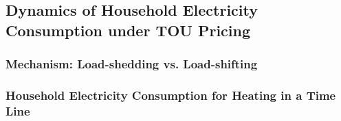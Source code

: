 \subsection{Dynamics of Household Electricity Consumption under TOU Pricing}
\label{Subsection:Dynamics-of-Household-Electricity-Consumption-under-Time-Of-Use-Electricity-Pricing}


\subsubsection{Mechanism: Load-shedding vs. Load-shifting}
\label{Sub-subsection:Mechanism}


\subsubsection{Household Electricity Consumption for Heating in a Time Line}
\label{Sub-subsection:Household-Electricity-Consumption-for-Heating-in-a-Time-Line}


